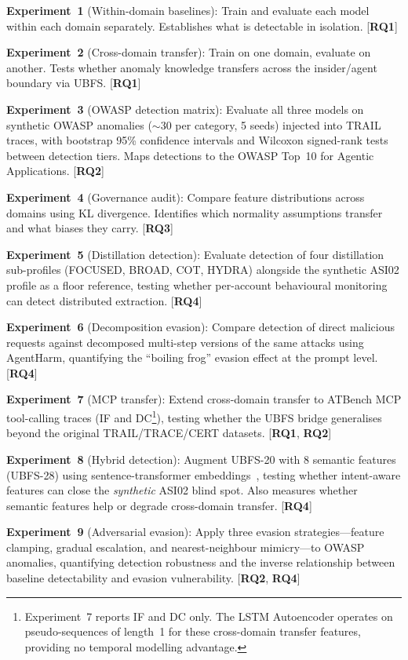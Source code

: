 \documentclass[conference]{IEEEtran}
\newcommand{\RQ}[1]{\textbf{RQ#1}}
\begin{document}
\textbf{Experiment~1} (Within-domain baselines): Train and evaluate each model within each domain separately. Establishes what is detectable in isolation. [\RQ{1}]

\textbf{Experiment~2} (Cross-domain transfer): Train on one domain, evaluate on another. Tests whether anomaly knowledge transfers across the insider/agent boundary via UBFS. [\RQ{1}]

\textbf{Experiment~3} (OWASP detection matrix): Evaluate all three models on synthetic OWASP anomalies (${\sim}$30 per category, 5 seeds) injected into TRAIL traces, with bootstrap 95\% confidence intervals and Wilcoxon signed-rank tests between detection tiers. Maps detections to the OWASP Top~10 for Agentic Applications. [\RQ{2}]

\textbf{Experiment~4} (Governance audit): Compare feature distributions across domains using KL divergence. Identifies which normality assumptions transfer and what biases they carry. [\RQ{3}]

\textbf{Experiment~5} (Distillation detection): Evaluate detection of four distillation sub-profiles (FOCUSED, BROAD, COT, HYDRA) alongside the synthetic ASI02 profile as a floor reference, testing whether per-account behavioural monitoring can detect distributed extraction. [\RQ{4}]

\textbf{Experiment~6} (Decomposition evasion): Compare detection of direct malicious requests against decomposed multi-step versions of the same attacks using AgentHarm, quantifying the ``boiling frog'' evasion effect at the prompt level. [\RQ{4}]

\textbf{Experiment~7} (MCP transfer): Extend cross-domain transfer to ATBench MCP tool-calling traces (IF and DC\footnote{Experiment~7 reports IF and DC only. The LSTM Autoencoder operates on pseudo-sequences of length~1 for these cross-domain transfer features, providing no temporal modelling advantage.}), testing whether the UBFS bridge generalises beyond the original TRAIL/TRACE/CERT datasets. [\RQ{1}, \RQ{2}]

\textbf{Experiment~8} (Hybrid detection): Augment UBFS-20 with 8 semantic features (UBFS-28) using sentence-transformer embeddings~\cite{reimers2019sentbert}, testing whether intent-aware features can close the \emph{synthetic} ASI02 blind spot. Also measures whether semantic features help or degrade cross-domain transfer. [\RQ{4}]

\textbf{Experiment~9} (Adversarial evasion): Apply three evasion strategies---feature clamping, gradual escalation, and nearest-neighbour mimicry---to OWASP anomalies, quantifying detection robustness and the inverse relationship between baseline detectability and evasion vulnerability. [\RQ{2}, \RQ{4}]
\end{document}
